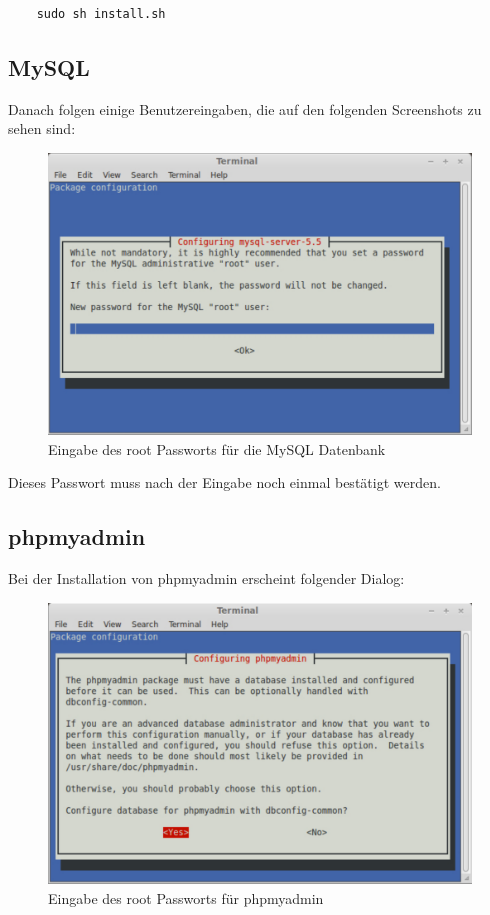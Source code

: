 \begin{lstlisting}
	sudo sh install.sh
\end{lstlisting}

\subsection{MySQL}
Danach folgen einige Benutzereingaben, die auf den folgenden Screenshots zu sehen sind:
\begin{figure}[!ht]
	\centering
	\includegraphics[width=15cm]{fig/configuring_mysql}
	\caption{Eingabe des root Passworts für die MySQL Datenbank}
\end{figure}
\par

Dieses Passwort muss nach der Eingabe noch einmal bestätigt werden.\par
\newpage
\subsection{phpmyadmin}
Bei der Installation von phpmyadmin erscheint folgender Dialog:
\begin{figure}[!ht]
	\centering
	\includegraphics[width=15cm]{fig/configure_phpmyadmin}
	\caption{Eingabe des root Passworts für phpmyadmin}
\end{figure}

